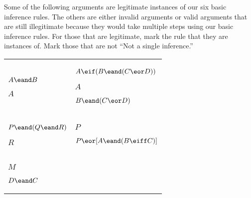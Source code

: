 \begin{exercises}
\begin{longtabu}{X[1]X[1]}
\end{longtabu}
\end{exercises}


\noindent\problempart Some of the following arguments are legitimate instances of our six basic inference rules. The others are either invalid arguments or valid arguments that are still illegitimate because they would take multiple steps using our basic inference rules. For those that are legitimate, mark the rule that they are instances of. Mark those that are not ``Not a single inference.''

\begin{exercises} \vspace{-.5cm}
\begin{longtabu}{X[1]X[1]} 

\item %
	\begin{earg*}
	\item  $A \eand B$
 
	\itemc[.3]$A$ 	
	\end{earg*}
&

\item %
	\begin{earg*}
	\item $A \eif (B \eand (C \eor D))$
	\item $A$
 
	\itemc[.3]$B \eand (C \eor D)$
	\end{earg*}
\\

\item %
	\begin{earg*}
	\item $P \eand (Q \eand R)$
 
	\itemc[.3]$R$
	\end{earg*}
&

\item %
	\begin{earg*}
	\item  $P$
 
	\itemc[.3] $P \eor [A \eand (B \eiff C)]$
	\end{earg*}
\\

\item %
	\begin{earg*}
	\item  $M$
	\item  $D \eand C$
 

\end{earg*}
\end{longtabu}
\end{exercises}
